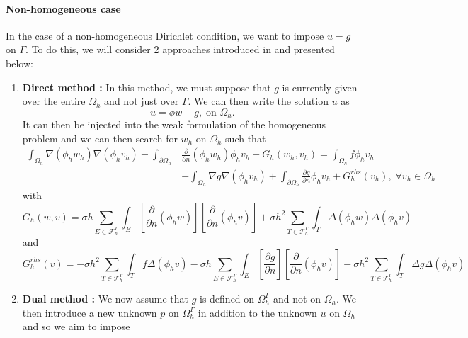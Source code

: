 \paragraph{Non-homogeneous case} \label{FEMs.PhiFEM.details.nh}

In the case of a non-homogeneous Dirichlet condition, we want to impose $u=g$ on $\Gamma$. To do this, we will consider 2 approaches introduced in \cite{cotin_phi-fem_nodate} and presented below:

\begin{enumerate}[label=\textbullet]
	\item \textbf{Direct method :} In this method, we must suppose that $g$ is currently given over the entire $\Omega_h$ and not just over $\Gamma$. We can then write the solution $u$ as
	\begin{equation*}
		u=\phi w +g, \; \text{on } \Omega_h.
	\end{equation*}
	It can then be injected into the weak formulation of the homogeneous problem and we can then search for $w_h$ on $\Omega_h$ such that
	\begin{align*}
		\int_{\Omega_h}\nabla(\phi_h w_h)\nabla(\phi_h v_h)-\int_{\partial\Omega_h}&\frac{\partial}{\partial n}(\phi_h w_h)\phi_h v_h+G_h(w_h,v_h)=\int_{\Omega_h}f\phi_h v_h \\
		&-\int_{\Omega_h}\nabla g\nabla(\phi_h v_h)+\int_{\partial\Omega_h}\frac{\partial g}{\partial n}\phi_h v_h+G_h^{rhs}(v_h), \; \forall v_h\in \Omega_h
	\end{align*}
	with
	\begin{equation*}
		G_h(w,v)=\sigma h\sum_{E\in\mathcal{F}_h^\Gamma}\int_E\left[\frac{\partial}{\partial n}(\phi_h w)\right]\left[\frac{\partial}{\partial n}(\phi_h v)\right]+\sigma h^2\sum_{T\in\mathcal{T}_h^\Gamma}\int_T \Delta(\phi_h w)\Delta(\phi_h v)
	\end{equation*}
	and
	\begin{equation*}
		G_h^{rhs}(v)=-\sigma h^2\sum_{T\in\mathcal{T}_h^\Gamma}\int_T f\Delta(\phi_h v)-\sigma h\sum_{E\in\mathcal{F}_h^\Gamma}\int_E\left[\frac{\partial g}{\partial n}\right]\left[\frac{\partial}{\partial n}(\phi_h v)\right]-\sigma h^2\sum_{T\in\mathcal{T}_h^\Gamma}\int_T \Delta g\Delta(\phi_h v)
	\end{equation*}
	\item \textbf{Dual method :} We now assume that $g$ is defined on $\Omega_h^\Gamma$ and not on $\Omega_h$. We then introduce a new unknown $p$ on $\Omega_h^\Gamma$ in addition to the unknown $u$ on $\Omega_h$ and so we aim to impose

\end{enumerate}
